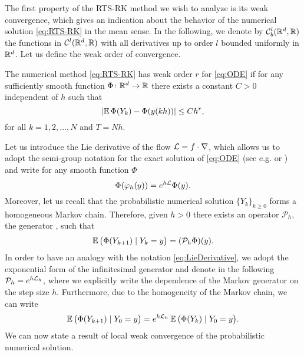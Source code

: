 \documentclass[10pt]{article}
\begin{document}
The first property of the RTS-RK method we wish to analyze is its weak convergence, which gives an indication about the behavior of the numerical solution \eqref{eq:RTS-RK} in the mean sense. In the following, we denote by $\mathcal C^l_b(\mathbb{R}^d, \mathbb{R})$ the functions in $\mathcal C^l(\mathbb{R}^d, \mathbb{R})$ with all derivatives up to order $l$ bounded uniformly in $\mathbb{R}^d$.  Let us define the weak order of convergence. 
\begin{definition} The numerical method \eqref{eq:RTS-RK} has weak order $r$ for \eqref{eq:ODE} if for any sufficiently smooth function $\Phi\colon\mathbb{R}^d \to \mathbb{R}$ there exists a constant $C > 0$ independent of $h$ such that
	\begin{equation}
		\lvert\operatorname{\mathbb{E}}\Phi(Y_k) - \Phi(y(kh))\rvert \leq Ch^r,
	\end{equation}
	for all $k = 1, 2, \ldots, N$ and $T = Nh$.
\end{definition} 
Let us introduce the Lie derivative of the flow $\mathcal{L} = f \cdot \nabla$, which allows us to adopt the semi-group notation for the exact solution of \eqref{eq:ODE} (see e.g. \cite[Section III.5.1]{HLW06} or \cite[Section 4.3]{PaS08}) and write for any smooth function $\Phi$
\begin{equation}\label{eq:LieDerivative}
	\Phi(\varphi_h(y)) = e^{h\mathcal{L}} \Phi(y).
\end{equation}
Moreover, let us recall that the probabilistic numerical solution $\{Y_k\}_{k\geq 0}$ forms a homogeneous Markov chain. Therefore, given $h > 0$ there exists an operator $\mathcal{P}_h$, the generator \cite[Section 2.3]{Pav14}, such that
\begin{equation}
	\operatorname{\mathbb{E}} \big(\Phi(Y_{k+1})\mid Y_k = y\big) = (\mathcal{P}_h\Phi)(y).
\end{equation}
In order to have an analogy with the notation \eqref{eq:LieDerivative}, we adopt the exponential form of the infinitesimal generator and denote in the following $\mathcal{P}_h = e^{h\mathcal{L}_h}$, where we explicitly write the dependence of the Markov generator on the step size $h$. Furthermore, due to the homogeneity of the Markov chain, we can write
\begin{equation}\label{eq:MarkovProperty}
	\operatorname{\mathbb{E}} \big(\Phi(Y_{k+1})\mid Y_0 = y\big) = e^{h\mathcal{L}_h}\operatorname{\mathbb{E}} \big(\Phi(Y_k)\mid Y_0 = y\big).
\end{equation}
We can now state a result of local weak convergence of the probabilistic numerical solution.
\end{document}

